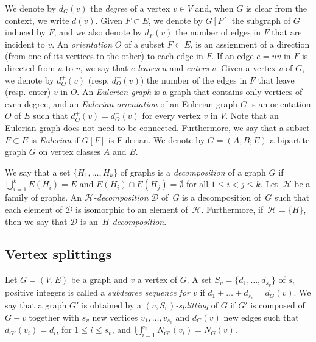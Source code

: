 \documentclass[12pt,reqno,a4paper]{amsart}
\newcommand{\D}{\mathcal{D}}
\begin{document}
 We denote by \(d_G(v)\) the 
\emph{degree} of a vertex \(v\in V\) and, when \(G\) is clear from the 
context, we write \(d(v)\). 
Given \(F\subset E\), we denote by $G[F]$ the subgraph of $G$ induced by $F$, and 
we also denote by \(d_{F}(v)\) the number of edges in \(F\) that are incident to \(v\).
An \emph{orientation} \(O\) of a subset \(F\subset E\),
is an assignment of a direction (from one of its vertices to the other) to each edge in \(F\).
If an edge \(e = uv\) in \(F\) is directed from \(u\) to \(v\),
we say that \(e\) \emph{leaves} \(u\) and \emph{enters} \(v\).
Given a vertex \(v\) of \(G\), we denote by \(d_O^+(v)\) (resp. \(d_O^-(v)\))
the number of the edges in \(F\) that leave (resp. enter) \(v\) in \(O\).
An \emph{Eulerian graph} is a graph that contains only vertices of even degree, and
an \emph{Eulerian orientation} of an Eulerian graph \(G\) 
is an orientation \(O\) of \(E\) such that \(d_O^+(v) = d_O^-(v)\) 
for every vertex \(v\) in \(V\). 
Note that an Eulerian graph does not need to be connected.
Furthermore, we say that a subset $F\subset E$ is \emph{Eulerian}
if \(G[F]\) is Eulerian.  We denote by $G=(A,B;E)$ a
bipartite graph $G$ on vertex classes $A$ and $B$.
 

We say that a set 
$\{H_1,\ldots,H_k\}$ of graphs is a
\emph{decomposition} of a graph $G$ if $\bigcup_{i=1}^k
E(H_i) = E$ and $E(H_i)\cap E(H_j)=\emptyset$ for all $1\leq i<j\leq
k$. Let~\(\mathcal{H}\) be a family of graphs. An
\emph{\(\mathcal{H}\)-decomposition} $\D$ of~\(G\) is a
decomposition of~\(G\) such that each element of $\D$ is
isomorphic to an element of~\(\mathcal{H}\). Furthermore, if~\(\mathcal{H} =
\{H\}\), then we say that $\D$ is an~\emph{\(H\)-decomposition}.



\subsection{Vertex splittings}
Let $G=(V,E)$ be a graph and $v$ a vertex of \(G\). 
A set $S_v=\{d_1,\ldots,d_{s_v}\}$ of $s_v$ positive integers is called a 
\emph{subdegree sequence for $v$} if
$d_1+\ldots+d_{s_v}=d_G(v)$. We say that a graph $G'$ is obtained 
by a \emph{$(v,S_v)$-splitting} 
of \(G\)
if $G'$ is composed of 
$G-v$ together with $s_v$ new vertices $v_1,\ldots,v_{s_v}$ and {$d_G(v)$ new edges} such that $d_{G'}(v_i)=d_i$, for $1\leq i\leq 
s_v$, and $\bigcup_{i=1}^{s_v} N_{G'}(v_i) = N_G(v)$.
\end{document}
